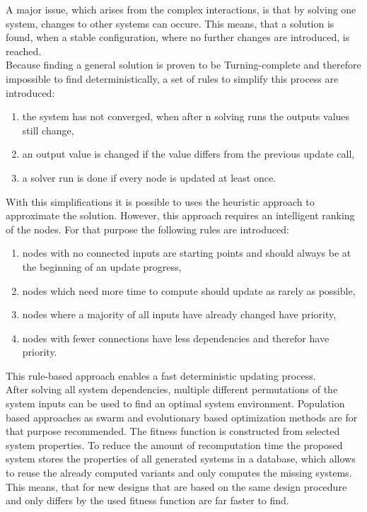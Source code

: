 A major issue, which arises from the complex interactions, is that by solving one system, changes to other systems can occure.
This means, that a solution is found, when a stable configuration, where no further changes are introduced, is reached.\\
Because finding a general solution is proven to be Turning-complete and therefore impossible to find deterministically, 
a set of rules to simplify this process are introduced:
\begin{enumerate}
    \item the system has not converged, when after n solving runs the outputs values still change,
    \item an output value is changed if the value differs from the previous update call,
    \item a solver run is done if every node is updated at least once.
\end{enumerate}
With this simplifications it is possible to uses the heuristic approach to approximate the solution.
However, this approach requires an intelligent ranking of the nodes.
For that purpose the following rules are introduced:
\begin{enumerate}
    \item nodes with no connected inputs are starting points and should always be at the beginning of an update progress,
    \item nodes which need more time to compute should update as rarely as possible,
    \item nodes where a majority of all inputs have already changed have priority,
    \item nodes with fewer connections have less dependencies and therefor have priority.
\end{enumerate}
This rule-based approach enables a fast deterministic updating process.\\
After solving all system dependencies, multiple different permutations of the system inputs can be used to find an optimal system environment.
Population based approaches as swarm and evolutionary based optimization methods are for that purpose recommended.
The fitness function is constructed from selected system properties.
To reduce the amount of recomputation time the proposed system stores the properties of all generated systems
in a database, which allows to reuse the already computed variants and only computes the missing systems.
This means, that for new designs that are based on the same design procedure and only differs by the used fitness function are far faster to find.